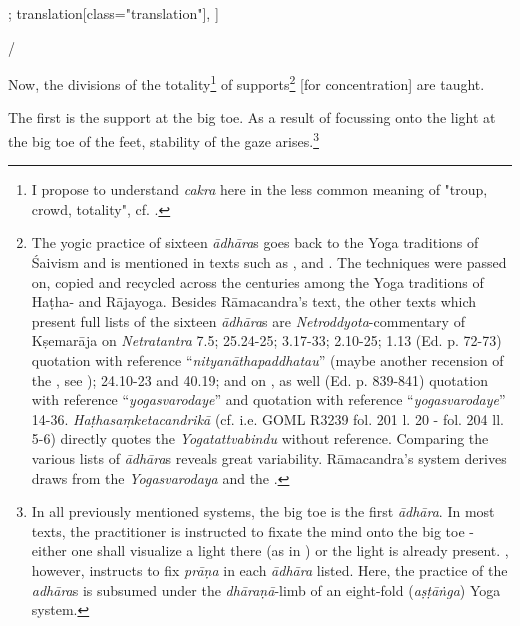 \begin{alignment}[
  texts=edition[class="edition"];
  translation[class="translation"],
  ]
\begin{edition}
\begin{prose}[p30_01]
{  }/
\end{prose}
  \end{edition}
  \begin{translation}
    \begin{tlate}[p30_01]
      \noindent
      Now, the divisions of the totality\footnote{I propose to understand \textit{cakra} here in the less common meaning of "troup, crowd, totality", cf. \citeauthor[vol. 2, 1958:209]{petersburger}.} of supports\footnote{The yogic practice of sixteen \textit{ādhāra}s goes back to the Yoga traditions of Śaivism and is mentioned in texts such as ,  and . The techniques were passed on, copied and recycled across the centuries among the Yoga traditions of Haṭha- and Rājayoga. Besides Rāmacandra's text, the other texts which present full lists of the sixteen \textit{ādhāra}s are \textit{Netroddyota}-commentary of Kṣemarāja on \textit{Netratantra} 7.5;  25.24-25;  3.17-33;  2.10-25;  1.13 (Ed. p. 72-73) quotation with reference ``\textit{nityanāthapaddhatau}'' (maybe another recension of the , see \citeauthor[2023:149]{shivayogapradipika});  24.10-23 and 40.19; and  on , as well  (Ed. p. 839-841) quotation with reference ``\textit{yogasvarodaye}'' and  quotation with reference ``\textit{yogasvarodaye}'' 14-36. \textit{Haṭhasaṃketacandrikā} (cf. i.e. GOML R3239 fol. 201 l. 20 - fol. 204 ll. 5-6) directly quotes the \textit{Yogatattvabindu} without reference. Comparing the various lists of \textit{ādhāra}s reveals great variability. Rāmacandra's system derives draws from the \textit{Yogasvarodaya} and the .} [for concentration] are taught.%
      
      The first is the support at the big toe. As a result of focussing onto the light at the big toe of the feet, stability of the gaze arises.\footnote{In all previously mentioned systems, the big toe is the first \textit{ādhāra}. In most texts, the practitioner is instructed to fixate the mind onto the big toe - either one shall visualize a light there (as in ) or the light is already present. , however, instructs to fix \textit{prāṇa} in each \textit{ādhāra} listed. Here, the practice of the \textit{adhāra}s is subsumed under the \textit{dhāraṇā}-limb of an eight-fold (\textit{aṣṭāṅga}) Yoga system.}
      

\end{tlate}
\end{translation}
\end{alignment}
